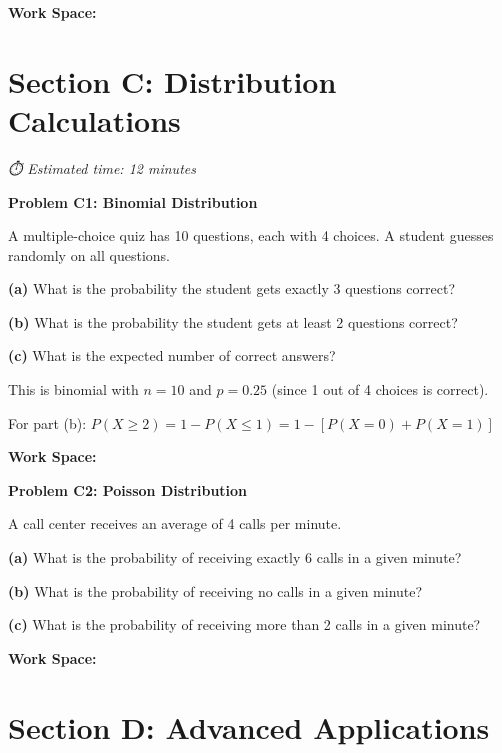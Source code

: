 \documentclass[
  11pt,
]{article}
\begin{document}
\textbf{Work Space:}

\section{Section C: Distribution
Calculations}\label{section-c-distribution-calculations}

\emph{⏱️ Estimated time: 12 minutes}

\textbf{Problem C1: Binomial Distribution}

A multiple-choice quiz has 10 questions, each with 4 choices. A student
guesses randomly on all questions.

\textbf{(a)} What is the probability the student gets exactly 3
questions correct?

\textbf{(b)} What is the probability the student gets at least 2
questions correct?

\textbf{(c)} What is the expected number of correct answers?

\begin{tcolorbox}[enhanced jigsaw, coltitle=black, colback=white, titlerule=0mm, left=2mm, opacityback=0, bottomtitle=1mm, title=\textcolor{quarto-callout-tip-color}{\faLightbulb}\hspace{0.5em}{Tip}, colframe=quarto-callout-tip-color-frame, toptitle=1mm, arc=.35mm, leftrule=.75mm, toprule=.15mm, bottomrule=.15mm, breakable, rightrule=.15mm, colbacktitle=quarto-callout-tip-color!10!white, opacitybacktitle=0.6]

This is binomial with \(n = 10\) and \(p = 0.25\) (since 1 out of 4
choices is correct).

For part (b):
\(P(X \geq 2) = 1 - P(X \leq 1) = 1 - [P(X = 0) + P(X = 1)]\)

\end{tcolorbox}

\textbf{Work Space:}

\textbf{Problem C2: Poisson Distribution}

A call center receives an average of 4 calls per minute.

\textbf{(a)} What is the probability of receiving exactly 6 calls in a
given minute?

\textbf{(b)} What is the probability of receiving no calls in a given
minute?

\textbf{(c)} What is the probability of receiving more than 2 calls in a
given minute?

\textbf{Work Space:}

\section{Section D: Advanced
Applications}\label{section-d-advanced-applications}
\end{document}
